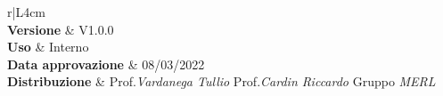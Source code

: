 \begin{center}
	\begin{tabular}{r|L{4cm}}
		 \\
		\hline
		\textbf{Versione}			& V1.0.0 \\
		\textbf{Uso}		& Interno \\
		\textbf{Data approvazione} 			& 08/03/2022 \\
		\textbf{Distribuzione} 	&	Prof.\textit{Vardanega Tullio} \newline Prof.\textit{Cardin Riccardo} \newline Gruppo \textit{MERL} \\
	\end{tabular}
\end{center}
	